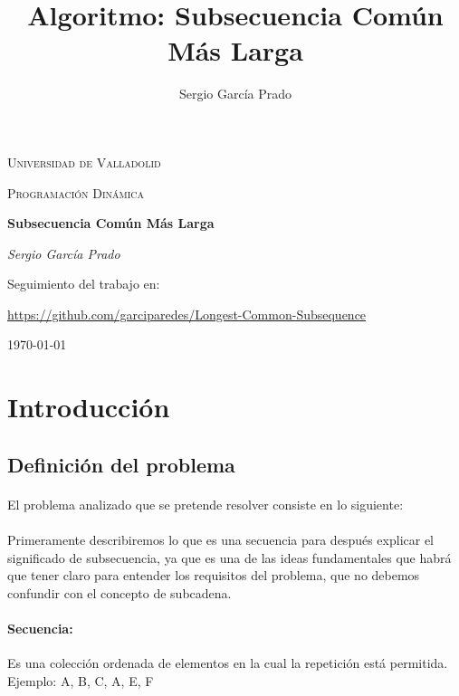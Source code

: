 \documentclass{article}
\title{Algoritmo: Subsecuencia Común Más Larga}
\author{Sergio García Prado}
\begin{document}
\begin{titlepage}
	\centering
	{\scshape\LARGE Universidad de Valladolid \par}
	\vspace{1cm}
	{\scshape\Large Programación Dinámica\par}
	\vspace{1.5cm}
	{\huge\bfseries Subsecuencia Común Más Larga\par}
	\vspace{2cm}
	{\Large\itshape Sergio García Prado\par}

	\vfill
	Seguimiento del trabajo en: \par
	\href{https://github.com/garciparedes/Longest-Common-Subsequence}{https://github.com/garciparedes/Longest-Common-Subsequence}

	\vfill


	{\large \today\par}
\end{titlepage}

\section{Introducción}

	\subsection{Definición del problema}

		\paragraph{}
		El problema analizado que se pretende resolver consiste en lo siguiente:

		\paragraph{}
		Primeramente describiremos lo que es una secuencia para después explicar el significado de subsecuencia, ya que es una de las ideas fundamentales que habrá que tener claro para entender los requisitos del problema, que no debemos confundir con el concepto de  subcadena.

		\paragraph{Secuencia:}
		Es una colección ordenada de elementos en la cual la repetición está permitida.
		\newline{}
		Ejemplo: {A, B, C, A, E, F}
\end{document}
